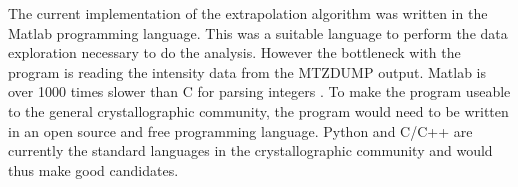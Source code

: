 The current implementation of the extrapolation algorithm was written in the Matlab programming language.
This was a suitable language to perform the data exploration necessary to do the analysis.
However the bottleneck with the program is reading the intensity data from the MTZDUMP output.
Matlab is over 1000 times slower than C for parsing integers \cite{bezanson2014julia}.
To make the program useable to the general crystallographic community, the program would need to be written in an open source and free programming language.
Python and C/C++ are currently the standard languages in the crystallographic community and would thus make good candidates.
